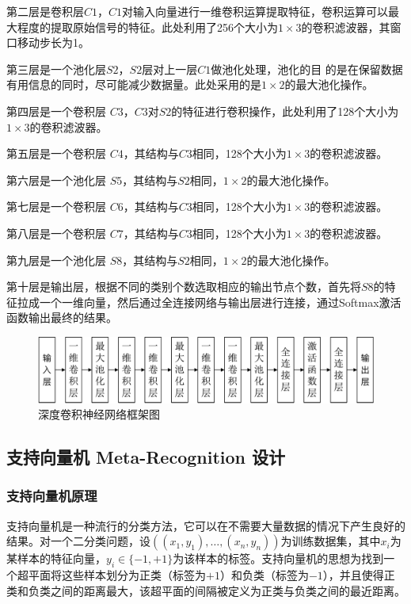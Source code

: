 第二层是卷积层$C1$，$C1$对输入向量进行一维卷积运算提取特征，卷积运算可以最
大程度的提取原始信号的特征。此处利用了256个大小为$1\times 3$的卷积滤波器，其窗口移动步长为1。

第三层是一个池化层$S2$，$S2$层对上一层$C1$做池化处理，池化的目
的是在保留数据有用信息的同时，尽可能减少数据量。此处采用的是$1\times 2$的最大池化操作。

第四层是一个卷积层 $C3$，$C3$对$S2$的特征进行卷积操作，此处利用了128个大小为$1\times 3$的卷积滤波器。

第五层是一个卷积层 $C4$，其结构与$C3$相同，128个大小为$1\times 3$的卷积滤波器。

第六层是一个池化层 $S5$，其结构与$S2$相同，$1\times 2$的最大池化操作。

第七层是一个卷积层 $C6$，其结构与$C3$相同，128个大小为$1\times 3$的卷积滤波器。

第八层是一个卷积层 $C7$，其结构与$C3$相同，128个大小为$1\times 3$的卷积滤波器。

第九层是一个池化层 $S8$，其结构与$S2$相同，$1\times 2$的最大池化操作。

第十层是输出层，根据不同的类别个数选取相应的输出节点个数，首先将$S8$的特征拉成一个一维向量，然后通过全连接网络与输出层进行连接，通过Softmax激活函数输出最终的结果。

\begin{figure}[hbt]
	\centering
	\includegraphics[width=13.5cm]{figures/emitter/struct_emitter}
	\caption{深度卷积神经网络框架图}
	\label{fig:struct_emitter}
\end{figure}

\subsection{支持向量机 Meta-Recognition 设计}

\subsubsection{支持向量机原理}
支持向量机是一种流行的分类方法，它可以在不需要大量数据的情况下产生良好的结果。对一个二分类问题，设$((x_1,y_1),\dots,(x_n,y_n))$为训练数据集，其中$x_i$为某样本的特征向量，$y_i\in\{-1,+1\}$为该样本的标签。支持向量机的思想为找到一个超平面将这些样本划分为正类（标签为$+1$）和负类（标签为$-1$），并且使得正类和负类之间的距离最大，该超平面的间隔被定义为正类与负类之间的最近距离。

